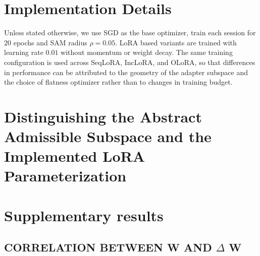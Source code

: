 \documentclass{article}
\theoremstyle{plain}
\theoremstyle{definition}
\theoremstyle{remark}
\begin{document}













\section{Implementation Details}


Unless stated otherwise, we use SGD as the base optimizer, train each session for $20$ epochs and SAM radius $\rho = 0.05$. LoRA based variants are trained with learning rate $0.01$ without momentum or weight decay. The same training configuration is used across SeqLoRA, IncLoRA, and OLoRA, so that differences in performance can be attributed to the geometry of the adapter subspace and the choice of flatness optimizer rather than to changes in training budget.


\section{Distinguishing the Abstract Admissible Subspace and the Implemented LoRA Parameterization}

    
\section{Supplementary results}

\subsection{CORRELATION BETWEEN W AND $\Delta$ W}
\end{document}

